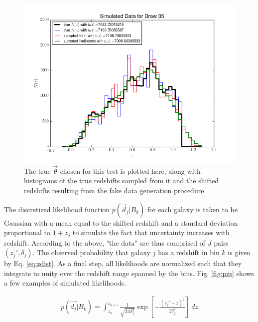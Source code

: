 \documentclass[12pt, onecolumn]{emulateapj}
\begin{document}
\begin{figure}
\label{fig:samples}
\includegraphics[scale=0.5]{exdata.png}
\caption{The true $\vec{\theta}$ chosen for this test is plotted here, along with histograms of the true redshifts sampled from it and the shifted redshifts resulting from the fake data generation procedure.}
\end{figure}

The discretized likelihood function $p(\vec{d}_{j}|B_{k})$ for each galaxy is taken to be Gaussian with a mean equal to the shifted redshift and a standard deviation proportional to $1+z_{j}$ to simulate the fact that uncertainty increases with redshift.  According to the above, "the data" are thus comprised of $J$ pairs $(z_{j}',\delta_{j})$.  The observed probability that galaxy $j$ has a redshift in bin $k$ is given by Eq. \ref{eq:zdist}.  As a final step, all likelihoods are normalized such that they integrate to unity over the redshift range spanned by the bins.  Fig. \ref{fig:pzs} shows a few examples of simulated likelihoods.

\begin{eqnarray}
\label{eq:zdist}
p(\vec{d_{j}}|B_{k}) = \int_{z_{k}}^{z_{k+1}} \frac{1}{\sqrt{2\pi\delta_{j}^{2}}}\exp\left[-\frac{(z_{j}'-z)^{2}}{2\delta_{j}^{2}}\right]\ dz
\end{eqnarray}
\end{document}
